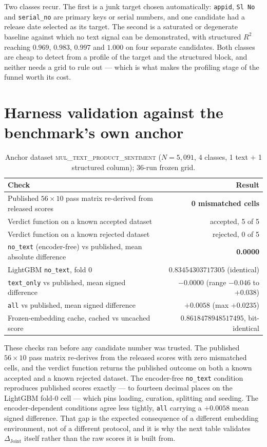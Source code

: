 \documentclass[10pt,letterpaper]{article}
\newcommand{\dj}{\Delta_{\mathrm{Joint}}}
\begin{document}
\noindent Two classes recur. The first is a junk target chosen automatically: \texttt{appid},
\texttt{Sl No} and \texttt{serial\_no} are primary keys or serial numbers, and one candidate
had a release date selected as its target. The second is a saturated or degenerate baseline
against which no text signal can be demonstrated, with structured $R^2$ reaching $0.969$,
$0.983$, $0.997$ and $1.000$ on four separate candidates. Both classes are cheap to detect from
a profile of the target and the structured block, and neither needs a grid to rule out --- which
is what makes the profiling stage of the funnel worth its cost.


\section{Harness validation against the benchmark's own anchor}
\label{app:anchor}

\begin{table}[H]
\centering\small
\caption{Anchor dataset \textsc{mul\_text\_product\_sentiment} ($N = 5{,}091$, 4 classes,
1 text $+$ 1 structured column); 36-run frozen grid.}
\begin{tabular}{lr}
\toprule
Check & Result \\
\midrule
Published $56 \times 10$ pass matrix re-derived from released scores & \textbf{0 mismatched cells} \\
Verdict function on a known accepted dataset & accepted, 5 of 5 \\
Verdict function on a known rejected dataset & rejected, 0 of 5 \\
\texttt{no\_text} (encoder-free) vs published, mean absolute difference & \textbf{0.0000} \\
\quad LightGBM \texttt{no\_text}, fold 0 & $0.83454303717305$ (identical) \\
\texttt{text\_only} vs published, mean signed difference & $-0.0000$ (range $-0.046$ to $+0.038$) \\
\texttt{all} vs published, mean signed difference & $+0.0058$ (max $+0.0235$) \\
Frozen-embedding cache, cached vs uncached score & $0.8618478948517495$, bit-identical \\
\bottomrule
\end{tabular}
\end{table}

\noindent These checks ran before any candidate number was trusted. The published $56 \times 10$ pass
matrix re-derives from the released scores with zero mismatched cells, and the verdict function
returns the published outcome on both a known accepted and a known rejected dataset. The
encoder-free \texttt{no\_text} condition reproduces published scores exactly --- to fourteen
decimal places on the LightGBM fold-0 cell --- which pins loading, curation, splitting and
seeding. The encoder-dependent conditions agree less tightly, \texttt{all} carrying a
$+0.0058$ mean signed difference. That gap is the expected consequence of a different embedding
environment, not of a different protocol, and it is why the next table validates $\dj$ itself
rather than the raw scores it is built from.
\end{document}

